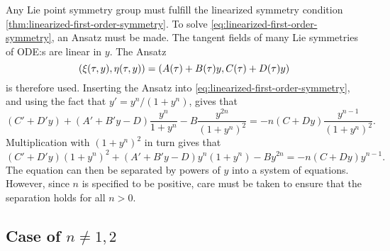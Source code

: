 Any Lie point symmetry group must fulfill the linearized symmetry condition \ref{thm:linearized-first-order-symmetry}.
To solve \cref{eq:linearized-first-order-symmetry}, an Ansatz must be made.
The tangent fields of many Lie symmetries of ODE:s are linear in \(y\).
The Ansatz
\begin{equation}
  \pqty{\xi(\tau,y),\eta(\tau,y)} = \pqty{A(\tau) + B(\tau)y,C(\tau) + D(\tau)y}
\end{equation}
is therefore used.
Inserting the Ansatz into \cref{eq:linearized-first-order-symmetry}, and using the fact that \(y' = y^n / (1 + y^n)\), gives that
\begin{equation}
  (C' + D'y) + (A' + B'y - D) \frac{y^n}{1 + y^n} - B \frac{y^{2n}}{(1 + y^n)^2} =
  -n(C + Dy) \frac{y^{n-1}}{(1 + y^n)^2}.
\end{equation}
Multiplication with \((1 + y^n)^2\) in turn gives that
\begin{equation} \label{eq:hill-linear-symmetry}
  (C' + D'y)(1 + y^n)^2 + (A' + B'y - D)y^n(1 + y^n) - By^{2n} =
  -n(C + Dy) y^{n-1}.
\end{equation}
The equation can then be separated by powers of \(y\) into a system of equations.
However, since \(n\) is specified to be positive, care must be taken to ensure that the separation holds for all \(n>0\).

\subsection{Case of \texorpdfstring{\(n\neq1,2\)}{n not 1 or 2}}

